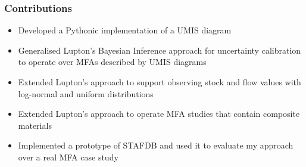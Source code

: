 \documentclass[ %
                    author={Tom Jager},
                supervisor={Dr. Daniel Schien},
                    degree={MEng},
                     title={A Bayesian Inference Engine for Calibrating Uncertainty over UMIS Structured MFA Systems},
                  subtitle={},
                      type={research},
                      year={2019} ]{dissertation}
\begin{document}
\subsubsection*{Contributions}
\begin{itemize}
    \item Developed a Pythonic implementation of a UMIS diagram
    \item Generalised Lupton's Bayesian Inference approach for uncertainty calibration to operate over MFAs described by UMIS diagrams
    \item Extended Lupton's approach to support observing stock and flow values with log-normal and uniform distributions
    \item Extended Lupton's approach to operate MFA studies that contain composite materials
    \item Implemented a prototype of STAFDB and used it to evaluate my approach over a real MFA case study
\end{itemize}
\end{document}
